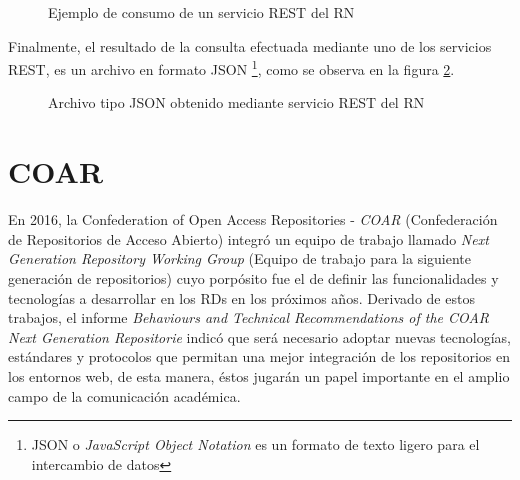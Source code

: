 \begin{figure}[!ht]
    \centering
    \caption{Ejemplo de consumo de un servicio REST del RN} %
    \label{ejemplo_consumo_REST_RN}
\end{figure}

Finalmente, el resultado de la consulta efectuada mediante uno de los servicios REST, es un archivo en formato JSON \footnote{JSON o \textit{JavaScript Object Notation} es un  formato de texto ligero para el intercambio de datos}, como se observa en la figura \ref{JSON_ejemplo_consumo_REST_RN}.

\begin{figure}[!ht]
    \centering
    \caption{Archivo tipo JSON obtenido mediante servicio REST del RN} %
    \label{JSON_ejemplo_consumo_REST_RN}
\end{figure}

\section{COAR}

En 2016, la Confederation of Open Access Repositories - \textit{COAR} (Confederación de Repositorios de Acceso Abierto) integró un equipo de trabajo llamado \textit{Next Generation Repository Working Group} (Equipo de trabajo para la siguiente generación de repositorios) cuyo porpósito fue el de definir las funcionalidades y tecnologías a desarrollar en los RDs en los próximos años. Derivado de estos trabajos, el informe \textit{Behaviours and Technical Recommendations of the COAR Next Generation Repositorie} \cite{NextGenerationRepositories} indicó que será necesario adoptar nuevas tecnologías, estándares y protocolos que permitan una mejor integración de los repositorios en los entornos web, de esta manera, éstos jugarán un papel importante en el amplio campo de la comunicación académica.

